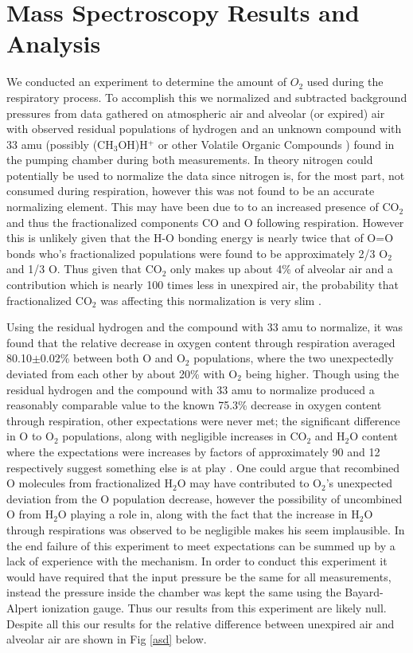 \documentclass[prb,preprint]{revtex4-1}
\begin{document}
\section{Mass Spectroscopy Results and Analysis}

We conducted an experiment to determine the amount of $O_2$ used during the respiratory process. To accomplish this we normalized and subtracted background pressures from data gathered on atmospheric air and alveolar (or expired) air with observed residual populations of hydrogen and an unknown compound with 33 amu (possibly (CH$_3$OH)H$^+$ or other Volatile Organic Compounds \cite{orgs}) found in the pumping chamber during both measurements. In theory nitrogen could potentially be used to normalize the data since nitrogen is, for the most part, not consumed during respiration, however this was not found to be an accurate normalizing element. This may have been due to to an increased presence of CO$_2$ and thus the fractionalized components CO and O following respiration. However this is unlikely given that the H-O bonding energy is nearly twice that of O=O bonds who's fractionalized populations were found to be approximately 2/3 O$_2$ and 1/3 O. Thus given that CO$_2$ only makes up about 4\% of alveolar air and a contribution which is nearly 100 times less in unexpired air, the probability that fractionalized CO$_2$ was affecting this normalization is very slim \cite{comp}.

Using the residual hydrogen and the compound with 33 amu to normalize, it was found that the relative decrease in oxygen content through respiration averaged 80.10$\pm0.02\%$ between both O and O$_2$ populations, where the two unexpectedly deviated from each other by about 20\% with O$_2$ being higher. Though using the residual hydrogen and the compound with 33 amu to normalize produced a reasonably comparable value to the known 75.3\% decrease in oxygen content through respiration, other expectations were never met; the significant difference in O to O$_2$ populations, along with negligible increases in CO$_2$ and H$_2$O content where the expectations were increases by factors of approximately 90 and 12 respectively suggest something else is at play \cite{comp}. One could argue that recombined O molecules from fractionalized H$_2$O may have contributed to O$_2$'s unexpected deviation from the O population decrease, however the possibility of uncombined O from H$_2$O playing a role in, along with the fact that the increase in H$_2$O through respirations was observed to be negligible makes his seem implausible. In the end failure of this experiment to meet expectations can be summed up by a lack of experience with the mechanism. In order to conduct this experiment it would have required that the input pressure be the same for all measurements, instead the pressure inside the chamber was kept the same using the Bayard-Alpert ionization gauge. Thus our results from this experiment are likely null. Despite all this our results for the relative difference between unexpired air and alveolar air are shown in Fig \ref{asd} below.
\end{document}
